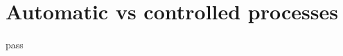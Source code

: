 \documentclass[a4paper]{article}
\title{}
\date{}
\begin{document}
    \maketitle
    
    \section{Automatic vs controlled processes}
    pass
\end{document}
